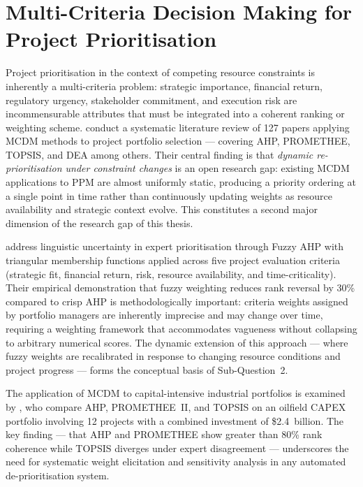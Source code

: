 \section{Multi-Criteria Decision Making for Project Prioritisation}
\label{sec:lit_mcdm}

Project prioritisation in the context of competing resource constraints is inherently a
multi-criteria problem: strategic importance, financial return, regulatory urgency,
stakeholder commitment, and execution risk are incommensurable attributes that must be
integrated into a coherent ranking or weighting scheme. \textcite{kandakoglu2024mcdm} conduct
a systematic literature review of 127 papers applying MCDM methods to project portfolio
selection — covering AHP, PROMETHEE, TOPSIS, and DEA among others. Their central finding is
that \textit{dynamic re-prioritisation under constraint changes} is an open research gap:
existing MCDM applications to PPM are almost uniformly static, producing a priority ordering
at a single point in time rather than continuously updating weights as resource availability
and strategic context evolve. This constitutes a second major dimension of the research gap
of this thesis.

\textcite{chatterjee2018fuzzy} address linguistic uncertainty in expert prioritisation through
Fuzzy AHP with triangular membership functions applied across five project evaluation
criteria (strategic fit, financial return, risk, resource availability, and time-criticality).
Their empirical demonstration that fuzzy weighting reduces rank reversal by 30\% compared to
crisp AHP is methodologically important: criteria weights assigned by portfolio managers are
inherently imprecise and may change over time, requiring a weighting framework that
accommodates vagueness without collapsing to arbitrary numerical scores. The dynamic
extension of this approach — where fuzzy weights are recalibrated in response to changing
resource conditions and project progress — forms the conceptual basis of Sub-Question~2.

The application of MCDM to capital-intensive industrial portfolios is examined by
\textcite{alhashimi2017mcdm}, who compare AHP, PROMETHEE~II, and TOPSIS on an oilfield CAPEX
portfolio involving 12 projects with a combined investment of \$2.4~billion. The key finding
— that AHP and PROMETHEE show greater than 80\% rank coherence while TOPSIS diverges under
expert disagreement — underscores the need for systematic weight elicitation and sensitivity
analysis in any automated de-prioritisation system.

